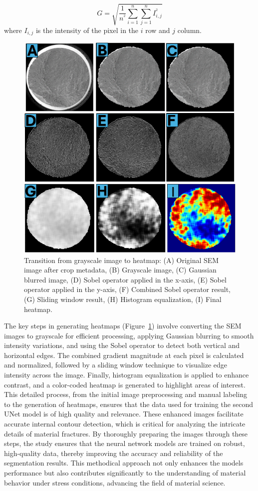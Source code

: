\documentclass{ieeeaccess}
\begin{document}
\begin{equation}
\label{eq:gradient}
G=\sqrt{\frac{1}{n^{^2}}\sum_{i=1}^{n}\sum_{j=1}^{n}I_{i,j}^{^2}}
\end{equation}
where $I_{i,j}$ is the intensity of the pixel in the $i$ row and $j$ column.
\begin{figure}[!t] 
  \centering
  \includegraphics[width=0.672\linewidth]{figures/heatmap_generation.png}
  \caption{Transition from grayscale image to heatmap: (A) Original SEM image after crop metadata, (B) Grayscale image, (C) Gaussian blurred image, (D) Sobel operator applied in the x-axis, (E) Sobel operator applied in the y-axis, (F) Combined Sobel operator result, (G) Sliding window result, (H) Histogram equalization, (I) Final heatmap.}
  \label{fig:transition_heatmap}
\end{figure}
The key steps in generating heatmaps (Figure~\ref{fig:transition_heatmap}) involve converting the SEM images to grayscale for efficient processing, applying Gaussian blurring to smooth intensity variations, and using the Sobel operator to detect both vertical and horizontal edges. The combined gradient magnitude at each pixel is calculated and normalized, followed by a sliding window technique to visualize edge intensity across the image. Finally, histogram equalization is applied to enhance contrast, and a color-coded heatmap is generated to highlight areas of interest.
This detailed process, from the initial image preprocessing and manual labeling to the generation of heatmaps, ensures that the data used for training the second UNet model is of high quality and relevance. These enhanced images facilitate accurate internal contour detection, which is critical for analyzing the intricate details of material fractures.
By thoroughly preparing the images through these steps, the study ensures that the neural network models are trained on robust, high-quality data, thereby improving the accuracy and reliability of the segmentation results. This methodical approach not only enhances the models performance but also contributes significantly to the understanding of material behavior under stress conditions, advancing the field of material science.
\end{document}
